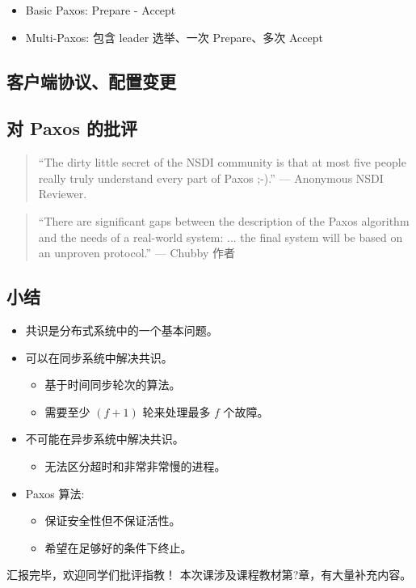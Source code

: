 \begin{itemize}
\item Basic Paxos: Prepare - Accept
\item Multi-Paxos: 包含 leader 选举、一次 Prepare、多次 Accept
\end{itemize}

\subsection{客户端协议、配置变更}

\subsection{对 Paxos 的批评}

\begin{quote}
``The dirty little secret of the NSDI community is that at most five people really truly understand every part of Paxos ;-).'' \hfill --- Anonymous NSDI Reviewer.
\end{quote}
\begin{quote}
``There are significant gaps between the description of the Paxos algorithm and the needs of a real-world system: ... the final system will be based on an unproven protocol.'' \hfill --- Chubby 作者
\end{quote}

\subsection{小结}

\begin{itemize}
\item 共识是分布式系统中的一个基本问题。
\item 可以在同步系统中解决共识。
  \begin{itemize}
  \item 基于时间同步轮次的算法。
  \item 需要至少 $(f+1)$ 轮来处理最多 $f$ 个故障。
  \end{itemize}
\item 不可能在异步系统中解决共识。
  \begin{itemize}
  \item 无法区分超时和非常非常慢的进程。
  \end{itemize}
\item Paxos 算法:
  \begin{itemize}
  \item 保证安全性但不保证活性。
  \item 希望在足够好的条件下终止。
  \end{itemize}
\end{itemize}

汇报完毕，欢迎同学们批评指教！
本次课涉及课程教材第?章，有大量补充内容。 %

